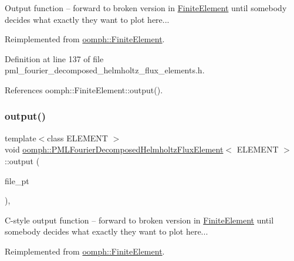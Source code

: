 Output function -- forward to broken version in \hyperlink{classoomph_1_1FiniteElement}{Finite\+Element} until somebody decides what exactly they want to plot here... 



Reimplemented from \hyperlink{classoomph_1_1FiniteElement_afa9d9b2670f999b43e6679c9dd28c457}{oomph\+::\+Finite\+Element}.



Definition at line 137 of file pml\+\_\+fourier\+\_\+decomposed\+\_\+helmholtz\+\_\+flux\+\_\+elements.\+h.



References oomph\+::\+Finite\+Element\+::output().

\mbox{\label{classoomph_1_1PMLFourierDecomposedHelmholtzFluxElement_a3c0bed2bf396c9ebf5d0379acd968546}} 
\subsubsection{\texorpdfstring{output()}{output()}\hspace{0.1cm}{\footnotesize\ttfamily [3/4]}}
{\footnotesize\ttfamily template$<$class E\+L\+E\+M\+E\+NT $>$ \\
void \hyperlink{classoomph_1_1PMLFourierDecomposedHelmholtzFluxElement}{oomph\+::\+P\+M\+L\+Fourier\+Decomposed\+Helmholtz\+Flux\+Element}$<$ E\+L\+E\+M\+E\+NT $>$\+::output (\begin{DoxyParamCaption}\item[{F\+I\+LE $\ast$}]{file\+\_\+pt }\end{DoxyParamCaption})\hspace{0.3cm}{\ttfamily [inline]}, {\ttfamily [virtual]}}

C-\/style output function -- forward to broken version in \hyperlink{classoomph_1_1FiniteElement}{Finite\+Element} until somebody decides what exactly they want to plot here... 

Reimplemented from \hyperlink{classoomph_1_1FiniteElement_a72cddd09f8ddbee1a20a1ff404c6943e}{oomph\+::\+Finite\+Element}.



